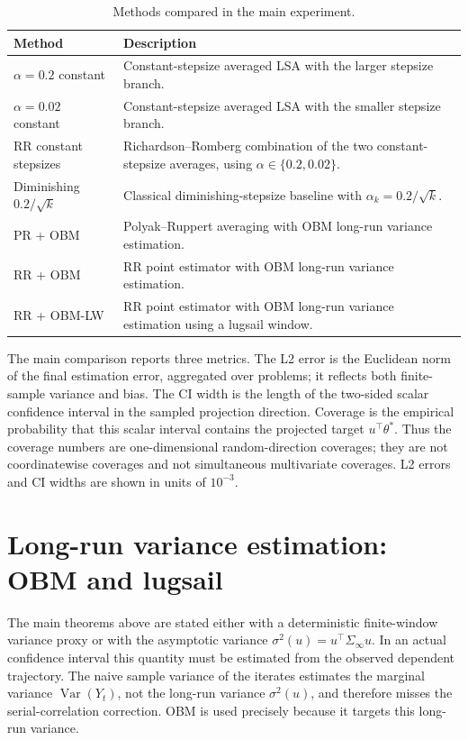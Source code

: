 \begin{table}[htbp]
\caption{Methods compared in the main experiment.}
\centering
\small
\begin{tabularx}{\textwidth}{>{\raggedright\arraybackslash}p{}X}
\toprule
\textbf{Method} & \textbf{Description} \\
\midrule
$\alpha=0.2$ constant & Constant-stepsize averaged LSA with the larger
  stepsize branch. \\
$\alpha=0.02$ constant & Constant-stepsize averaged LSA with the smaller
  stepsize branch. \\
RR constant stepsizes & Richardson--Romberg combination of the two
  constant-stepsize averages, using $\alpha\in\{0.2,0.02\}$. \\
Diminishing $0.2/\sqrt{k}$ & Classical diminishing-stepsize baseline with
  $\alpha_k=0.2/\sqrt{k}$. \\
PR + OBM & Polyak--Ruppert averaging with OBM long-run variance estimation. \\
RR + OBM & RR point estimator with OBM long-run variance estimation. \\
RR + OBM-LW & RR point estimator with OBM long-run variance estimation using
  a lugsail window. \\
\bottomrule
\end{tabularx}
\end{table}

The main comparison reports three metrics. The L2 error is the Euclidean norm
of the final estimation error, aggregated over problems; it reflects both
finite-sample variance and bias. The CI width is the length of the two-sided
scalar confidence interval in the sampled projection direction. Coverage is
the empirical probability that this scalar interval contains the projected
target $u^\top\theta^*$. Thus the coverage numbers are one-dimensional
random-direction coverages; they are not coordinatewise coverages and not
simultaneous multivariate coverages. L2 errors and CI widths are shown in
units of $10^{-3}$.

\section{Long-run variance estimation: OBM and lugsail}

The main theorems above are stated either with a deterministic finite-window
variance proxy or with the asymptotic variance
$\sigma^2(u)=u^\top\Sigma_\infty u$. In an actual confidence interval this
quantity must be estimated from the observed dependent trajectory. The naive
sample variance of the iterates estimates the marginal variance
$\operatorname{Var}(Y_t)$, not the long-run variance $\sigma^2(u)$, and
therefore misses the serial-correlation correction. OBM is used precisely
because it targets this long-run variance.


